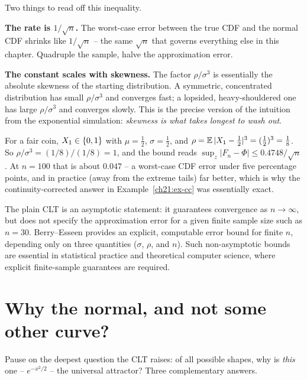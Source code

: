 Two things to read off this inequality.

\textbf{The rate is $1/\sqrt n$.} The worst-case error between the true CDF and the
normal CDF shrinks like $1/\sqrt n$ -- the same $\sqrt n$ that governs everything else
in this chapter. Quadruple the sample, halve the approximation error.

\textbf{The constant scales with skewness.} The factor $\rho/\sigma^3$ is essentially
the absolute skewness of the starting distribution. A symmetric, concentrated
distribution has small $\rho/\sigma^3$ and converges fast; a lopsided, heavy-shouldered
one has large $\rho/\sigma^3$ and converges slowly. This is the precise version of the
intuition from the exponential simulation: \emph{skewness is what takes longest to wash
out}.

\begin{example}
\label{ch21:ex-be}
For a fair coin, $X_1 \in \{0,1\}$ with $\mu = \tfrac12$, $\sigma = \tfrac12$, and
$\rho = \operatorname{\mathbb{E}}\,\lvert X_1 - \tfrac12\rvert^3 = (\tfrac12)^3 = \tfrac18$. So
$\rho/\sigma^3 = (1/8)/(1/8) = 1$, and the bound reads
$\sup_z |F_n - \Phi| \le 0.4748/\sqrt n$. At $n = 100$ that is about $0.047$ -- a
worst-case CDF error under five percentage points, and in practice (away from the
extreme tails) far better, which is why the continuity-corrected answer in
Example~\ref{ch21:ex-cc} was essentially exact.
\end{example}

\begin{aestheticbox}
The plain CLT is an asymptotic statement: it guarantees convergence as $n \to \infty$,
but does not specify the approximation error for a given finite sample size such as $n = 30$.
Berry--Esseen provides an explicit, computable error bound for finite $n$,
depending only on three quantities ($\sigma$, $\rho$, and $n$).
Such non-asymptotic bounds are essential in statistical practice and theoretical computer science,
where explicit finite-sample guarantees are required.
\end{aestheticbox}

\section{Why the normal, and not some other curve?}
\label{ch21:universality}

Pause on the deepest question the CLT raises: of all possible shapes, why
is \emph{this} one -- $e^{-x^2/2}$ -- the universal attractor? Three complementary
answers.


